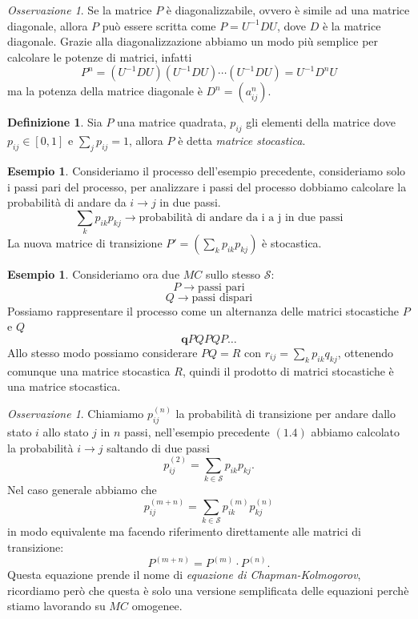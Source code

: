 \documentclass{article}
\theoremstyle{definition}
\newtheorem{definition}[theorem]{Definizione}
\newtheorem{example}[theorem]{Esempio}
\theoremstyle{remark}
\newtheorem{remark}[theorem]{Osservazione}
\begin{document}
\begin{remark}
    Se la matrice $P$ è diagonalizzabile, ovvero è simile ad una matrice diagonale, allora $P$ può essere
    scritta come $P=U^{-1}DU$, dove $D$ è la matrice diagonale. Grazie alla diagonalizzazione abbiamo un modo
    più semplice per calcolare le potenze di matrici, infatti
    $$P^n = (U^{-1}DU)(U^{-1}DU)\dotsb (U^{-1}DU) = U^{-1}D^nU$$
    ma la potenza della matrice diagonale è $D^n = (a_{ij}^n)$.
\end{remark}
\begin{definition}
    Sia $P$ una matrice quadrata, $p_{ij}$ gli elementi della matrice dove $p_{ij}\in[0,1]$ e $\sum_j p_{ij} = 1$,
    allora $P$ è detta \textit{matrice stocastica}.
\end{definition}
\begin{example}
    Consideriamo il processo dell'esempio precedente, consideriamo solo i passi pari del processo, per analizzare i passi del processo dobbiamo calcolare
    la probabilità di andare da $i\to j$ in due passi.
    $$\sum_k p_{ik}p_{kj}\rightarrow\text{probabilità di andare da i a j in due passi}$$
    La nuova matrice di transizione $P' = (\sum_k p_{ik}p_{kj})$  è stocastica.
\end{example}
\begin{example}
    Consideriamo ora due $MC$ sullo stesso $\mathcal{S}$:
    $$ P\to \text{passi pari}$$
    $$ Q\to \text{passi dispari}$$
    Possiamo rappresentare il processo come un alternanza delle matrici stocastiche $P$ e $Q$
    $$\boldsymbol{q}PQPQP\dots$$
    Allo stesso modo possiamo considerare  $PQ=R$ con $r_{ij} = \sum_k p_{ik}q_{kj}$, ottenendo comunque una matrice stocastica $R$,
    quindi il prodotto di matrici stocastiche è una matrice stocastica.
\end{example}
\begin{remark}
    Chiamiamo $p^{(n)}_{ij}$ la probabilità di transizione per andare dallo stato $i$ allo stato $j$ in $n$ passi,
    nell'esempio precedente $\mathbf{(1.4)}$ abbiamo calcolato la probabilità $i\to j$ saltando di due passi
    $$ p^{(2)}_{ij} = \sum_{k\in\mathcal{S}} p_{ik}p_{kj}.$$
    Nel caso generale abbiamo che
    $$p^{(m+n)}_{ij} = \sum_{k\in\mathcal{S}} p^{(m)}_{ik} p^{(n)}_{kj}$$
    in modo equivalente ma facendo riferimento direttamente alle matrici di transizione:
    $$P^{(m+n)} = P^{(m)}\cdot P^{(n)}.$$
    Questa equazione prende il nome di \textit{equazione di Chapman-Kolmogorov}, ricordiamo però che questa è solo una
    versione semplificata delle equazioni perchè stiamo lavorando su $MC$ omogenee.
\end{remark}
\end{document}

